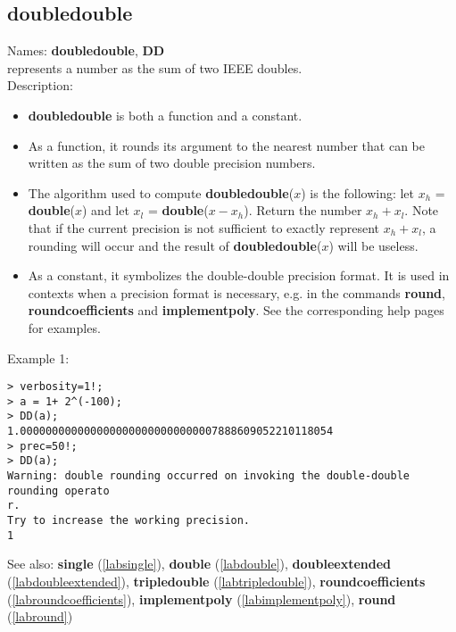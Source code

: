 \subsection{doubledouble}
\label{labdoubledouble}
\noindent Names: \textbf{doubledouble}, \textbf{DD}\\
represents a number as the sum of two IEEE doubles.\\
\noindent Description: \begin{itemize}

\item \textbf{doubledouble} is both a function and a constant.

\item As a function, it rounds its argument to the nearest number that can be written
   as the sum of two double precision numbers.

\item The algorithm used to compute \textbf{doubledouble}($x$) is the following: let $x_h$ = \textbf{double}($x$)
   and let $x_l$ = \textbf{double}($x-x_h$). Return the number $x_h+x_l$. Note that if the current 
   precision is not sufficient to exactly represent $x_h + x_l$, a rounding will occur
   and the result of \textbf{doubledouble}($x$) will be useless.

\item As a constant, it symbolizes the double-double precision format. It is used in 
   contexts when a precision format is necessary, e.g. in the commands 
   \textbf{round}, \textbf{roundcoefficients} and \textbf{implementpoly}.
   See the corresponding help pages for examples.
\end{itemize}
\noindent Example 1: 
\begin{center}\begin{minipage}{15cm}\begin{Verbatim}[frame=single]
> verbosity=1!;
> a = 1+ 2^(-100);
> DD(a);
1.0000000000000000000000000000007888609052210118054
> prec=50!;
> DD(a);
Warning: double rounding occurred on invoking the double-double rounding operato
r.
Try to increase the working precision.
1
\end{Verbatim}
\end{minipage}\end{center}
See also: \textbf{single} (\ref{labsingle}), \textbf{double} (\ref{labdouble}), \textbf{doubleextended} (\ref{labdoubleextended}), \textbf{tripledouble} (\ref{labtripledouble}), \textbf{roundcoefficients} (\ref{labroundcoefficients}), \textbf{implementpoly} (\ref{labimplementpoly}), \textbf{round} (\ref{labround})

